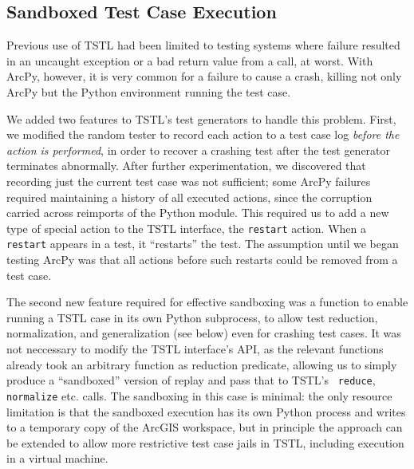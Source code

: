 \subsection{Sandboxed Test Case Execution}

Previous use of TSTL had been limited to testing systems where failure
resulted in an uncaught exception or a bad return value from a call,
at worst.  With ArcPy, however, it is very common for a failure to
cause a crash, killing not only ArcPy but the Python environment
running the test case.

We added two features to TSTL's test generators to handle this
problem.  First, we modified the random tester to record each action
to a test case log \emph{before the action is performed}, in order to recover a crashing
test after the test generator terminates abnormally.  After further experimentation,
we discovered that recording just the current test case was not
sufficient; some ArcPy failures required maintaining a history of all
executed actions, since the corruption carried across reimports of the
Python module.  This required us to add a new type of special action
to the TSTL interface, the {\tt restart} action.  When a {\tt restart}
appears in a test, it ``restarts'' the test.  The assumption until we
began testing ArcPy was that all actions before such restarts could be
removed from a test case.  

The second new feature required for effective sandboxing was a
function to enable running a TSTL case in its own Python subprocess,
to allow test reduction, normalization, and generalization (see below)
even for crashing test cases.  It was not neccessary to modify the
TSTL interface's API, as the relevant functions already took an
arbitrary function as reduction predicate, allowing us to simply
produce a ``sandboxed'' version of replay and pass that to TSTL's {\tt
  reduce}, {\tt normalize} etc. calls.  The sandboxing in this case is
minimal: the only resource limitation is that the sandboxed execution
has its own Python process and writes to a temporary copy of the
ArcGIS workspace, but in principle the approach can be extended to
allow more restrictive test case jails in TSTL, including execution in
a virtual machine.
